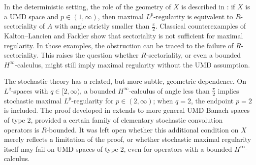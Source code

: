 \documentclass{amsart}
\theoremstyle{plain}
\theoremstyle{remark}
\theoremstyle{plain}
\numberwithin{equation}{section}
\newcommand{\1}{\mathbf 1}
\begin{document}
In the deterministic setting, the role of the geometry of $X$ is described in \cite{Weis-MathAnn}: if $X$ is a UMD space and $p\in(1,\infty)$, then maximal $L^p$-regularity is equivalent to $R$-sectoriality of $A$ with angle strictly smaller than $\frac{\pi}{2}$. Classical counterexamples of Kalton--Lancien and Fackler
\cite{KaLa,KaLa02,Fack14,Fackl16} show that sectoriality is not sufficient for maximal regularity. In those examples, the obstruction can be traced to the failure of
$R$-sectoriality. This raises the question whether
$R$-sectoriality, or even a bounded $H^\infty$-calculus, might still
imply maximal regularity without the UMD assumption.

The stochastic theory has a related, but more subtle, geometric dependence. On $L^q$-spaces with $q\in[2,\infty)$, a bounded $H^\infty$-calculus of angle less than $\frac{\pi}{2}$ implies stochastic maximal $L^p$-regularity for $p\in(2,\infty)$; when
$q=2$, the endpoint $p=2$ is included. The proof developed in \cite{NVW-SMR,NVW-Rbounded,NVW-survey} extends to more general UMD Banach spaces of type $2$, provided a certain family of elementary stochastic convolution operators is $R$-bounded. It was left open whether this additional condition on $X$ merely reflects a limitation of the proof, or whether stochastic maximal regularity itself may fail on UMD spaces of type $2$, even for operators with a bounded $H^\infty$-calculus.
\end{document}
